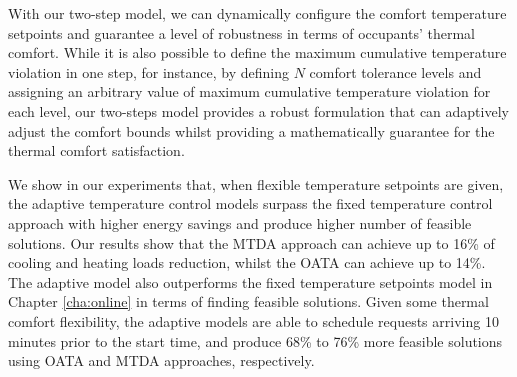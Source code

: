 %

With our two-step model, we can dynamically configure the comfort temperature setpoints and guarantee a level of robustness in terms of occupants' thermal comfort. 
While it is also possible to define the maximum cumulative temperature violation in one step, for instance, by defining $N$ comfort tolerance levels and assigning an arbitrary value of maximum cumulative temperature violation for each level, our two-steps model provides a robust formulation that can adaptively adjust the comfort bounds whilst providing a mathematically guarantee for the thermal comfort satisfaction.




We show in our experiments that, when flexible temperature setpoints are given, the adaptive temperature control models surpass the fixed temperature control approach with higher energy savings and produce higher number of feasible solutions.
Our results show that the MTDA approach can achieve up to 16\% of cooling and heating loads reduction, whilst the OATA can achieve up to 14\%. The adaptive model also outperforms the fixed temperature setpoints model in Chapter \ref{cha:online} in terms of finding feasible solutions. Given some thermal comfort flexibility, the adaptive models are able to schedule requests arriving 10 minutes prior to the start time, and produce 68\% to 76\% more feasible solutions using OATA and MTDA approaches, respectively.


